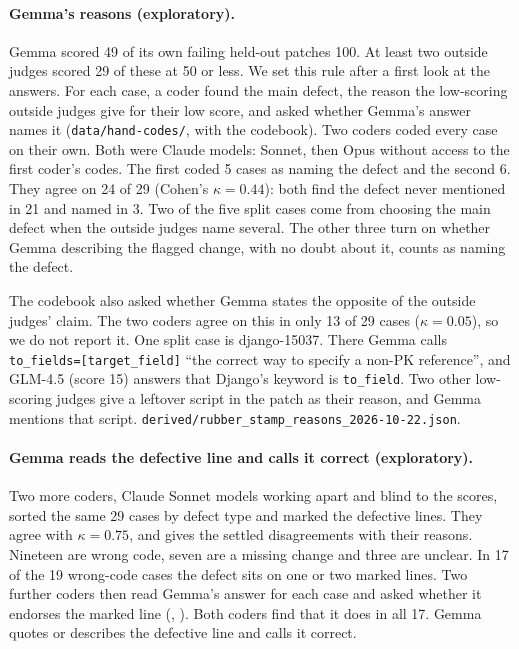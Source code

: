 \documentclass[10pt,letterpaper]{article}
\begin{document}
\paragraph{Gemma's reasons (exploratory).} Gemma scored 49 of its own failing held-out patches 100. At least two
outside judges scored 29 of these at 50 or less. We set this rule after a first look at the answers. For each
case, a coder found the main defect, the reason the low-scoring outside judges give for their low score, and asked
whether Gemma's answer names it (\texttt{data/hand-codes/}, with the codebook). Two coders coded every case on their own.
Both were Claude models: Sonnet, then Opus without access to the first coder's codes. The first coded 5 cases as
naming the defect and the second 6. They agree on 24 of 29 (Cohen's $\kappa = 0.44$): both find the defect never
mentioned in 21 and named in 3. Two of the five split cases come from choosing the main defect when the outside
judges name several. The other three turn on whether Gemma describing the flagged change, with no doubt about it,
counts as naming the defect.

The codebook also asked whether Gemma states the opposite of the outside judges' claim. The two coders
agree on this in only 13 of 29 cases ($\kappa = 0.05$), so we do not report it. One split case is django-15037. There Gemma
calls \texttt{to\_fields=[target\_field]} ``the correct way to specify a non-PK reference'', and GLM-4.5 (score 15)
answers that Django's keyword is \texttt{to\_field}. Two other low-scoring judges give a leftover script in the patch
as their reason, and Gemma mentions that script.
\texttt{derived/rubber\_stamp\_reasons\_2026-10-22.json}.

\paragraph{Gemma reads the defective line and calls it correct (exploratory).} Two more coders, Claude Sonnet models
working apart and blind to the scores, sorted the same 29 cases by defect type and marked the defective lines. They
agree with $\kappa = 0.75$, and  gives the settled disagreements with
their reasons. Nineteen are wrong code,
seven are a missing change and three are unclear. In 17 of the 19 wrong-code cases the defect sits on one or two marked
lines. Two further coders then read Gemma's answer for each case and asked whether it endorses the marked line
(, ). Both coders find that it does in all 17.
Gemma quotes or describes the defective line and calls it correct.
\end{document}
